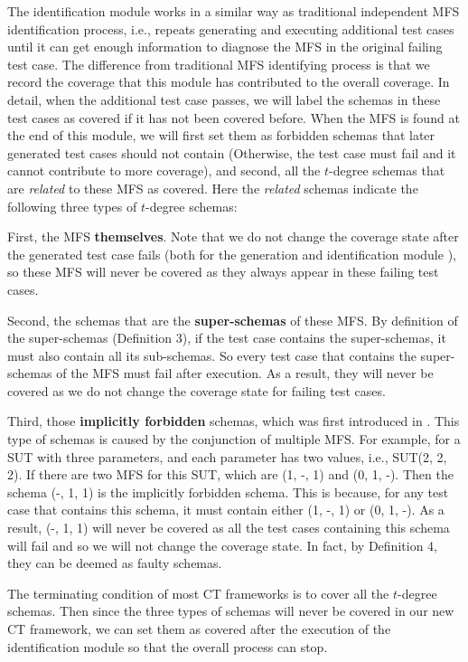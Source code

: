 \documentclass[journal,12pt,onecolumn,draftclsnofoot,]{IEEEtran}
\begin{document}
The identification module works in a similar way as traditional independent MFS identification process, i.e., repeats generating and executing additional test cases until it can get enough information to diagnose the MFS in the original failing test case. The difference from traditional MFS identifying process is that we record the coverage that this module has contributed to the overall coverage. In detail, when the additional test case passes, we will label the schemas in these test cases as covered if it has not been covered before. When the MFS is found at the end of this module, we will first set them as forbidden schemas that later generated test cases should not contain (Otherwise, the test case must fail and it cannot contribute to more coverage), and second, all the $t$-degree schemas that are \emph{related} to these MFS as covered. Here the \emph{related} schemas indicate the following three types of $t$-degree schemas:

First, the MFS \textbf{themselves}. Note that we do not change the coverage state after the generated test case fails (both for the generation and identification module ), so these MFS will never be covered as they always appear in these failing test cases.

Second, the schemas that are the \textbf{super-schemas} of these MFS. By definition of the super-schemas (Definition 3), if the test case contains the super-schemas, it must also contain all its sub-schemas. So every test case that contains the super-schemas of the MFS must fail after execution. As a result, they will never be covered as we do not change the coverage state for failing test cases.

Third, those \textbf{implicitly forbidden} schemas, which was first introduced in \cite{cohen2007interaction}.  This type of schemas is caused by the conjunction of multiple MFS. For example, for a SUT with three parameters, and each parameter has two values, i.e., SUT(2, 2, 2). If there are two MFS for this SUT, which are (1, -, 1) and (0, 1, -). Then the schema (-, 1, 1) is the implicitly forbidden schema. This is because, for any test case that contains this schema, it must contain either (1, -, 1) or (0, 1, -). As a result, (-, 1, 1) will never be covered as all the test cases containing this schema will fail and so we will not change the coverage state. In fact, by Definition 4, they can be deemed as faulty schemas.

The terminating condition of most CT frameworks is to cover all the $t$-degree schemas. Then since the three types of schemas will never be covered in our new CT framework, we can set them as covered after the execution of the identification module so that the overall process can stop.
\end{document}
